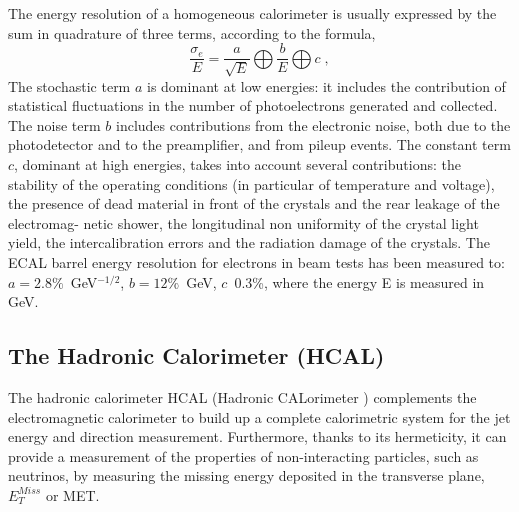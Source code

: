 The energy resolution of a homogeneous calorimeter is usually expressed by the sum
in quadrature of three terms, according to the formula,
\begin{equation}
\frac{\sigma_e}{E}=\frac{a}{\sqrt{E}} \bigoplus \frac{b}{E} \bigoplus c \; ,
\end{equation}
The stochastic term $a$ is dominant at low energies: it includes the contribution
of statistical fluctuations in the number of photoelectrons generated and collected.
The noise term $b$ includes contributions from the electronic noise,
both due to the photodetector and to the preamplifier, and from pileup
events. 
The constant term $c$, dominant at high energies, takes into account several contributions:
the stability of the operating conditions (in particular of temperature and voltage), the
presence of dead material in front of the crystals and the rear leakage of the electromag-
netic shower, the longitudinal non uniformity of the crystal light yield, the intercalibration
errors and the radiation damage of the crystals.
The ECAL barrel energy resolution for electrons in beam tests has been measured to: $a=2.8\%$~GeV$^{-1/2}$, $b=12\%$~GeV, $c$~0.3\%, where the energy E is measured in GeV.

\subsection*{The Hadronic Calorimeter (HCAL)}
The hadronic calorimeter HCAL (Hadronic CALorimeter ) complements the
electromagnetic calorimeter to build up a complete calorimetric system for the jet energy and
direction measurement. Furthermore, thanks to its hermeticity, it can provide a measurement 
of the properties of non-interacting particles, such as neutrinos, by measuring the
missing energy deposited in the transverse plane, $E_T^{Miss}$ or MET.

